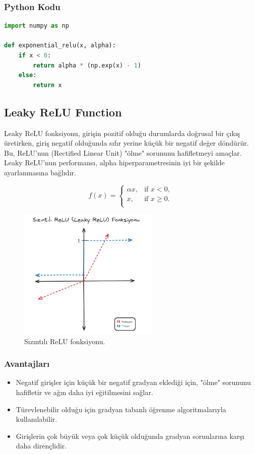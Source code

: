 \subsubsection{Python Kodu}

\begin{lstlisting}[language=Python]
import numpy as np

def exponential_relu(x, alpha):
    if x < 0:
        return alpha * (np.exp(x) - 1)
    else:
        return x
\end{lstlisting}

\newpage

\subsection{Leaky ReLU Function}
Leaky ReLU fonksiyonu, girişin pozitif olduğu durumlarda doğrusal bir çıkış üretirken, giriş negatif olduğunda sıfır yerine küçük bir negatif değer döndürür. Bu, ReLU'nun (Rectified Linear Unit) "ölme" sorununu hafifletmeyi amaçlar. Leaky ReLU'nun performansı, alpha hiperparametresinin iyi bir şekilde ayarlanmasına bağlıdır.

\[f(x) = \begin{cases} 
\alpha x, & \text{if } x < 0, \\
x, & \text{if } x \geq 0. \\
\end{cases}
\]

\begin{figure}[h]
    \centering
    \includegraphics[width=0.6\textwidth]{images/leaky_relu_function.png}
    \caption{Sızıntılı ReLU fonksiyonu.}
    \label{fig:enter-label}
\end{figure}

\subsubsection{Avantajları}
\begin{itemize}
    \item Negatif girişler için küçük bir negatif gradyan eklediği için, "ölme" sorununu hafifletir ve ağın daha iyi eğitilmesini sağlar.
    \item Türevlenebilir olduğu için gradyan tabanlı öğrenme algoritmalarıyla kullanılabilir.
    \item Girişlerin çok büyük veya çok küçük olduğunda gradyan sorunlarına karşı daha dirençlidir.
\end{itemize}

